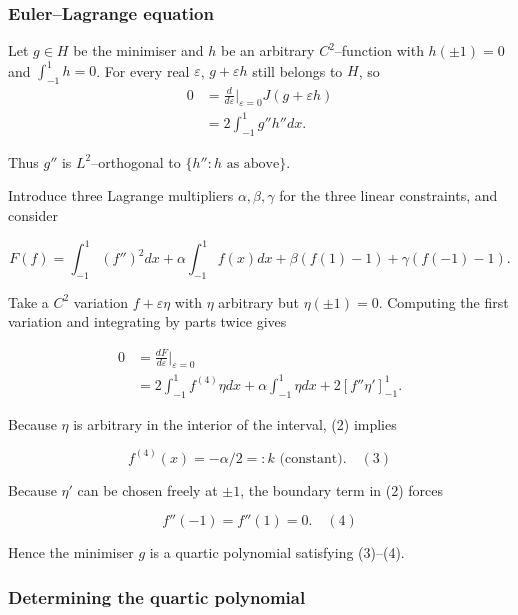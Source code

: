 \documentclass[12pt,a4paper]{article}
\theoremstyle{definition}
\begin{document}
    \subsubsection*{Euler--Lagrange equation}

        Let $g \in H$ be the minimiser and $h$ be an arbitrary $C^2$--function with $h(\pm 1) = 0$ and $\int_{-1}^{1} h = 0$.
        For every real $\varepsilon$, $g + \varepsilon h$ still belongs to $H$, so
        \begin{align}
            0 &= \frac{d}{d\varepsilon}\bigg|_{\varepsilon=0} J(g + \varepsilon h) \\
            &= 2 \int_{-1}^{1} g'' h'' dx. \tag{1}
        \end{align}

        Thus $g''$ is $L^2$--orthogonal to $\{h'': h \text{ as above}\}$.

        Introduce three Lagrange multipliers $\alpha, \beta, \gamma$ for the three linear constraints, and consider

        $$F(f) = \int_{-1}^{1}(f'')^2dx + \alpha\int_{-1}^{1}f(x)dx + \beta(f(1)-1) + \gamma(f(-1)-1).$$

        Take a $C^2$ variation $f + \varepsilon\eta$ with $\eta$ arbitrary but $\eta(\pm 1) = 0$.
        Computing the first variation and integrating by parts twice gives

        \begin{align}
            0 &= \frac{dF}{d\varepsilon}\bigg|_{\varepsilon=0} \\
            &= 2\int_{-1}^{1} f^{(4)} \eta dx + \alpha\int_{-1}^{1} \eta dx + 2[f''\eta']_{-1}^{1}. \tag{2}
        \end{align}

    Because $\eta$ is arbitrary in the interior of the interval, (2) implies

    $$f^{(4)}(x) = -\alpha / 2 =: k \text{ (constant).} \quad (3)$$

        Because $\eta'$ can be chosen freely at $\pm 1$, the boundary term in (2) forces

        $$f''(-1) = f''(1) = 0. \quad {(4)}$$


        Hence the minimiser $g$ is a quartic polynomial satisfying (3)--(4).

        \subsubsection*{Determining the quartic polynomial}
\end{document}
